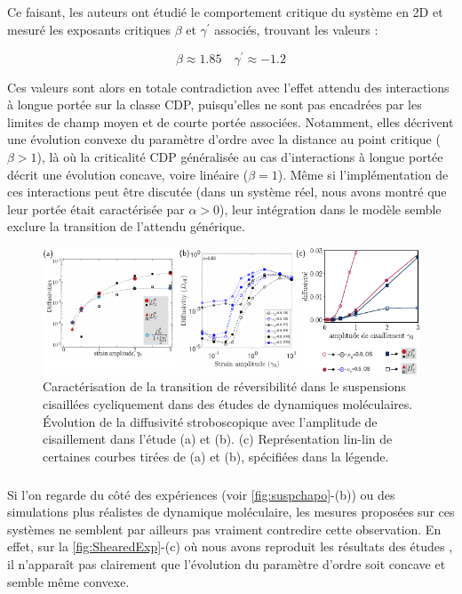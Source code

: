 \subparagraph{}Ce faisant, les auteurs ont étudié le comportement critique du système en 2D et mesuré les exposants critiques $\beta$ et $\gamma^\prime$ associés, trouvant les valeurs :

\begin{equation}
	\beta \approx 1.85 \quad \gamma^\prime \approx -1.2
\end{equation}

\noindent Ces valeurs sont alors en totale contradiction avec l'effet attendu des interactions à longue portée sur la classe CDP, puisqu'elles ne sont pas encadrées par les limites de champ moyen et de courte portée associées. Notamment, elles décrivent une évolution convexe du paramètre d'ordre avec la distance au point critique ($\beta >1$), là où la criticalité CDP généralisée au cas d'interactions à longue portée décrit une évolution concave, voire linéaire ($\beta = 1$). Même si l'implémentation de ces interactions peut être discutée (dans un système réel, nous avons montré que leur portée était caractérisée par $\alpha > 0$), leur intégration dans le modèle semble exclure la transition de l'attendu générique.


\begin{figure}[h]
	\centering
	\includegraphics[width=\textwidth]{Chapitre1/Figures/LongRange/ExpShear.pdf}
	\caption{Caractérisation de la transition de réversibilité dans le suspensions cisaillées cycliquement dans des études de dynamiques moléculaires. Évolution de la diffusivité stroboscopique avec l'amplitude de cisaillement dans l'étude \cite{metzger_irreversibility_2010} (a) et \cite{agrawal_dense_2024} (b). (c) Représentation lin-lin de certaines courbes tirées de (a) et (b), spécifiées dans la légende.}
	\label{fig:ShearedExp}
\end{figure}

\subparagraph{}Si l'on regarde du côté des expériences (voir \autoref{fig:suspchapo}-(b)) ou des simulations plus réalistes de dynamique moléculaire, les mesures proposées sur ces systèmes ne semblent par ailleurs pas vraiment contredire cette observation. En effet, sur la \autoref{fig:ShearedExp}-(c) où nous avons reproduit les résultats des études \cite{metzger_irreversibility_2010, agrawal_dense_2024}, il n'apparaît pas clairement que l'évolution du paramètre d'ordre soit concave et semble même convexe. 

